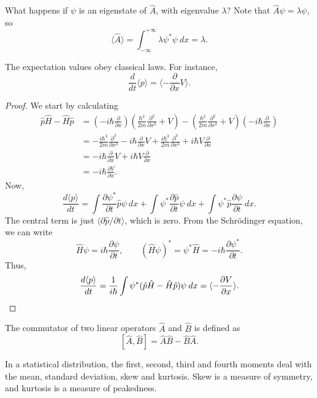 \documentclass[11pt]{article}
\newcommand\ddt[1]{\frac{d #1}{d t}}
\newcommand\ppx[1]{\frac{\partial #1}{\partial x}}
\newcommand\ppt[1]{\frac{\partial #1}{\partial t}}
\newcommand\pp[3][]{\frac{\partial^{#1}{#2}}{\partial {#3}^{#1}}}
\newcommand\E[1]{\langle #1 \rangle}
\theoremstyle{definition}
\theoremstyle{remark}
\numberwithin{equation}{section}
\begin{document}
    What happens if $\psi$ is an eigenstate of $\hat{A}$, with eigenvalue $\lambda$?
    Note that $\hat{A}\psi = \lambda\psi$, so \[
        \E{\hat{A}} = \int_{-\infty}^{+\infty} \lambda \psi^*\psi\:dx = \lambda.
    \]

    \begin{theorem}
        The expectation values obey classical laws. For instance, \[
            \ddt{}\E{p} = \E{-\ppx{}V}.
        \] 
    \end{theorem}
    \begin{proof}
        We start by calculating 
        \begin{align*}
            \hat{p}\hat{H} - \hat{H}\hat{p} &= \left(-i\hbar
            \ppx{}\right)\left(\frac{\hbar^2}{2m}\pp[2]{}{x} + V\right)
            - \left(\frac{\hbar^2}{2m}\pp[2]{}{x} + V\right)\left(-i\hbar
            \ppx{}\right) \\
                &= -\frac{i\hbar^3}{2m}\pp[3]{}{x} - i\hbar\ppx{}V +
                \frac{i\hbar^3}{2m}\pp[3]{}{x} + i\hbar V\ppx{} \\
                &= -i\hbar \ppx{}V + i\hbar V\ppx{} \\
                &= -i\hbar \ppx{V}.
        \end{align*}
        Now, \[
            \ddt{\E{p}} = \int \ppt{\psi^*}\hat{p}\psi\:dx + \int \psi^*
            \ppt{\hat{p}}\psi\:dx + \int \psi^*\hat{p}\ppt{\psi}\:dx.
        \] The central term is just $\E{\partial \hat{p} / \partial t}$, which is zero.
        From the Schr\"odinger equation, we can write \[
            \hat{H}\psi = i\hbar\ppt{\psi}, \qquad (\hat{H}\psi)^* = \psi^*\hat{H} =
            -i\hbar \ppt{\psi^*}.
        \] Thus, \[
            \ddt{\E{p}} = \frac{1}{i\hbar} \int \psi^*(\hat{p}\hat{H} -
            \hat{H}\hat{p}) \psi \:dx =  \E{-\ppx{V}}. \qedhere
        \] 
    \end{proof}

    \begin{definition}[Commutator]
        The commutator of two linear operators $\hat{A}$ and $\hat{B}$ is defined as
        \[
            [\hat{A}, \hat{B}] = \hat{A}\hat{B} - \hat{B}\hat{A}.
        \] 
    \end{definition}
    
    In a statistical distribution, the first, second, third and fourth moments deal
    with the mean, standard deviation, skew and kurtosis. Skew is a measure of
    symmetry, and kurtosis is a measure of peakedness.
\end{document}
